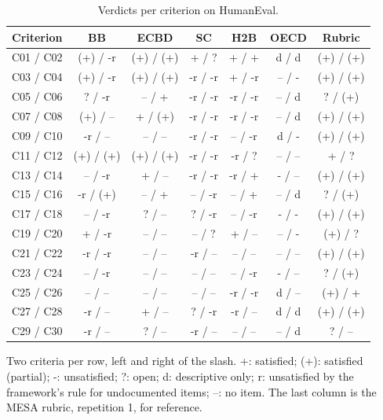 \documentclass[10pt,conference]{IEEEtran}
\begin{document}
\begin{table}[t]
\caption{Verdicts per criterion on HumanEval.}
\label{tab:grid-humaneval}
\centering
\footnotesize\begin{tabular}{@{}lcccccc@{}}\toprule
\textbf{Criterion} & \textbf{BB} & \textbf{ECBD} & \textbf{SC} & \textbf{H2B} & \textbf{OECD} & \textbf{Rubric} \\
\midrule
C01 / C02 & (+) / -r & (+) / (+) & + / ? & + / + & d / d & (+) / (+) \\
C03 / C04 & (+) / -r & (+) / (+) & -r / -r & + / -r & -- / - & (+) / (+) \\
C05 / C06 & ? / -r & -- / + & -r / -r & -r / -r & -- / d & ? / (+) \\
C07 / C08 & (+) / -- & + / (+) & -r / -r & -r / -r & -- / d & (+) / (+) \\
C09 / C10 & -r / -- & -- / -- & -r / -r & -- / -r & d / - & (+) / (+) \\
\midrule
C11 / C12 & (+) / (+) & (+) / (+) & -r / -r & -r / ? & -- / -- & + / ? \\
C13 / C14 & -- / -r & + / -- & -r / -r & -r / + & - / -- & (+) / (+) \\
C15 / C16 & -r / (+) & -- / + & -- / -r & -- / + & -- / d & ? / (+) \\
C17 / C18 & -- / -r & ? / -- & ? / -r & -- / -r & - / - & (+) / (+) \\
C19 / C20 & + / -r & -- / -- & -- / ? & + / -- & -- / - & (+) / ? \\
\midrule
C21 / C22 & -r / -r & -- / -- & -r / -- & -- / -- & -- / -- & (+) / (+) \\
C23 / C24 & -- / -r & -- / -- & -- / -- & -- / -r & - / -- & ? / (+) \\
C25 / C26 & -- / -- & -- / -- & -- / -- & -r / -r & d / -- & (+) / + \\
C27 / C28 & -r / -- & + / -- & ? / -r & -r / -- & d / d & (+) / (+) \\
C29 / C30 & -r / -- & ? / -- & -r / -- & -- / -- & -- / d & ? / -- \\
\bottomrule\end{tabular}
\par\vspace{2pt}\raggedright\footnotesize Two criteria per row, left and right of the slash. +: satisfied; (+): satisfied (partial); -: unsatisfied; ?: open; d: descriptive only; r: unsatisfied by the framework's rule for undocumented items; --: no item. The last column is the MESA rubric, repetition 1, for reference.
\end{table}
\end{document}
